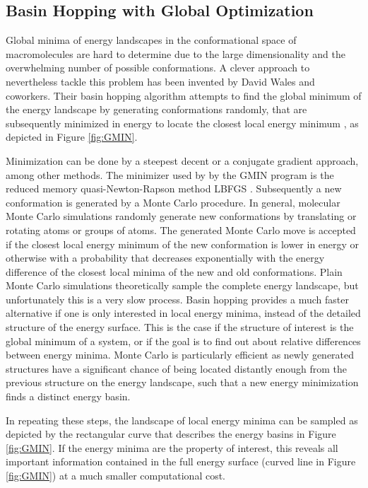 \documentclass[english, a4paper, 12pt, titlepage, draft]{article}
\begin{document}

\subsection{Basin Hopping with Global Optimization}

Global minima of energy landscapes in the conformational space of macromolecules are hard to determine due to the large dimensionality and the overwhelming number of possible conformations.
A clever approach to nevertheless tackle this problem has been invented by David Wales and coworkers.
Their basin hopping algorithm attempts to find the global minimum of the energy landscape by generating conformations randomly, that are subsequently minimized in energy to locate the closest local energy minimum \cite{basinHopping}, as depicted in Figure \ref{fig:GMIN}.

Minimization can be done by a steepest decent or a conjugate gradient approach, among other methods.
The minimizer used by by the GMIN program is the reduced memory quasi-Newton-Rapson method LBFGS \cite{LBFGS}.
Subsequently a new conformation is generated by a Monte Carlo procedure. 
In general, molecular Monte Carlo simulations randomly generate new conformations by translating or rotating atoms or groups of atoms.
The generated Monte Carlo move is accepted if the closest local energy minimum of the new conformation is lower in energy or otherwise with a probability that decreases exponentially with the energy difference of the closest local minima of the new and old conformations.
Plain Monte Carlo simulations theoretically sample the complete energy landscape, but unfortunately this is a very slow process.
Basin hopping provides a much faster alternative if one is only interested in local energy minima, instead of the detailed structure of the energy surface.
This is the case if the structure of interest is the global minimum of a system, or if the goal is to find out about relative differences between energy minima.
Monte Carlo is particularly efficient as newly generated structures have a significant chance of being located distantly enough from the previous structure on the energy landscape, such that a new energy minimization finds a distinct energy basin.

In repeating these steps, the landscape of local energy minima can be sampled as depicted by the rectangular curve that describes the energy basins in Figure \ref{fig:GMIN}.
If the energy minima are the property of interest, this reveals all important information contained in the full energy surface (curved line in Figure \ref{fig:GMIN}) at a much smaller computational cost.
\end{document}
